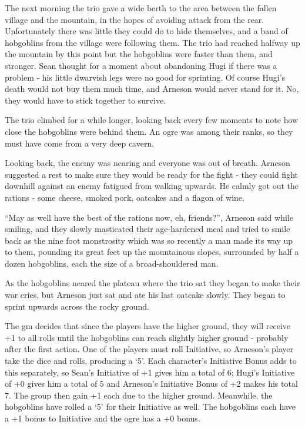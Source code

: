 \begin{exampletext}

The next morning the trio gave a wide berth to the area between the fallen village and the mountain, in the hopes of avoiding attack from the rear.
Unfortunately there was little they could do to hide themselves, and a band of hobgoblins from the village were following them.
The trio had reached halfway up the mountain by this point but the hobgoblins were faster than them, and stronger.
Sean thought for a moment about abandoning Hugi if there was a problem - his little dwarvish legs were no good for sprinting.
Of course Hugi's death would not buy them much time, and Arneson would never stand for it.
No, they would have to stick together to survive.

The trio climbed for a while longer, looking back every few moments to note how close the hobgoblins were behind them. An ogre was among their ranks, so they must have come from a very deep cavern.

Looking back, the enemy was nearing and everyone was out of breath.
Arneson suggested a rest to make sure they would be ready for the fight - they could fight downhill against an enemy fatigued from walking upwards.
He calmly got out the rations - some cheese, smoked pork, oatcakes and a flagon of wine.

``May as well have the best of the rations now, eh, friends?'', Arneson said while smiling, and they slowly masticated their age-hardened meal and tried to smile back as the nine foot monstrosity which was so recently a man made its way up to them, pounding its great feet up the mountainous slopes, surrounded by half a dozen hobgoblins, each the size of a broad-shouldered man.

As the hobgoblins neared the plateau where the trio sat they began to make their war cries, but Arneson just sat and ate his last oatcake slowly. They began to sprint upwards across the rocky ground.

The \gls{gm} decides that since the players have the higher ground, they will receive +1 to all rolls until the hobgoblins can reach slightly higher ground - probably after the first action.
One of the players must roll Initiative, so Arneson's player take the dice and rolls, producing a `5'.
Each character's Initiative Bonus adds to this separately, so Sean's Initiative of +1 gives him a total of 6; Hugi's Initiative of +0 gives him a total of 5 and Arneson's Initiative Bonus of +2 makes his total 7.
The group then gain +1 each due to the higher ground.
Meanwhile, the hobgoblins have rolled a `5' for their Initiative as well.
The hobgoblins each have a +1 bonus to Initiative and the ogre has a +0 bonus.


\end{exampletext}
